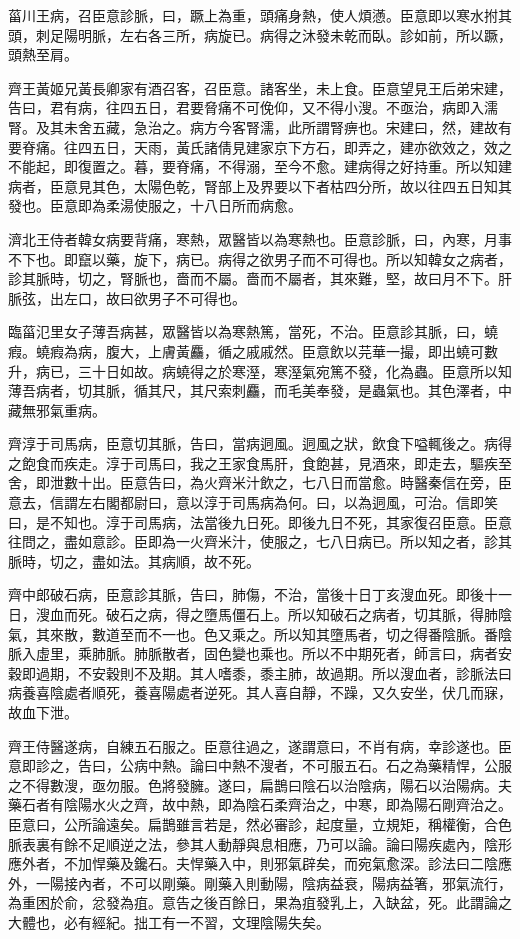 菑川王病，召臣意診脈，曰，蹶上為重，頭痛身熱，使人煩懣。臣意即以寒水拊其頭，刺足陽明脈，左右各三所，病旋已。病得之沐發未乾而臥。診如前，所以蹶，頭熱至肩。

齊王黃姬兄黃長卿家有酒召客，召臣意。諸客坐，未上食。臣意望見王后弟宋建，告曰，君有病，往四五日，君要脅痛不可俛仰，又不得小溲。不亟治，病即入濡腎。及其未舍五藏，急治之。病方今客腎濡，此所謂腎痹也。宋建曰，然，建故有要脊痛。往四五日，天雨，黃氏諸倩見建家京下方石，即弄之，建亦欲效之，效之不能起，即復置之。暮，要脊痛，不得溺，至今不愈。建病得之好持重。所以知建病者，臣意見其色，太陽色乾，腎部上及界要以下者枯四分所，故以往四五日知其發也。臣意即為柔湯使服之，十八日所而病愈。

濟北王侍者韓女病要背痛，寒熱，眾醫皆以為寒熱也。臣意診脈，曰，內寒，月事不下也。即竄以藥，旋下，病已。病得之欲男子而不可得也。所以知韓女之病者，診其脈時，切之，腎脈也，嗇而不屬。嗇而不屬者，其來難，堅，故曰月不下。肝脈弦，出左口，故曰欲男子不可得也。

臨菑氾里女子薄吾病甚，眾醫皆以為寒熱篤，當死，不治。臣意診其脈，曰，蟯瘕。蟯瘕為病，腹大，上膚黃麤，循之戚戚然。臣意飲以芫華一撮，即出蟯可數升，病已，三十日如故。病蟯得之於寒溼，寒溼氣宛篤不發，化為蟲。臣意所以知薄吾病者，切其脈，循其尺，其尺索刺麤，而毛美奉發，是蟲氣也。其色澤者，中藏無邪氣重病。

齊淳于司馬病，臣意切其脈，告曰，當病迵風。迵風之狀，飲食下嗌輒後之。病得之飽食而疾走。淳于司馬曰，我之王家食馬肝，食飽甚，見酒來，即走去，驅疾至舍，即泄數十出。臣意告曰，為火齊米汁飲之，七八日而當愈。時醫秦信在旁，臣意去，信謂左右閣都尉曰，意以淳于司馬病為何。曰，以為迵風，可治。信即笑曰，是不知也。淳于司馬病，法當後九日死。即後九日不死，其家復召臣意。臣意往問之，盡如意診。臣即為一火齊米汁，使服之，七八日病已。所以知之者，診其脈時，切之，盡如法。其病順，故不死。

齊中郎破石病，臣意診其脈，告曰，肺傷，不治，當後十日丁亥溲血死。即後十一日，溲血而死。破石之病，得之墮馬僵石上。所以知破石之病者，切其脈，得肺陰氣，其來散，數道至而不一也。色又乘之。所以知其墮馬者，切之得番陰脈。番陰脈入虛里，乘肺脈。肺脈散者，固色變也乘也。所以不中期死者，師言曰，病者安穀即過期，不安穀則不及期。其人嗜黍，黍主肺，故過期。所以溲血者，診脈法曰病養喜陰處者順死，養喜陽處者逆死。其人喜自靜，不躁，又久安坐，伏几而寐，故血下泄。

齊王侍醫遂病，自練五石服之。臣意往過之，遂謂意曰，不肖有病，幸診遂也。臣意即診之，告曰，公病中熱。論曰中熱不溲者，不可服五石。石之為藥精悍，公服之不得數溲，亟勿服。色將發臃。遂曰，扁鵲曰陰石以治陰病，陽石以治陽病。夫藥石者有陰陽水火之齊，故中熱，即為陰石柔齊治之，中寒，即為陽石剛齊治之。臣意曰，公所論遠矣。扁鵲雖言若是，然必審診，起度量，立規矩，稱權衡，合色脈表裏有餘不足順逆之法，參其人動靜與息相應，乃可以論。論曰陽疾處內，陰形應外者，不加悍藥及鑱石。夫悍藥入中，則邪氣辟矣，而宛氣愈深。診法曰二陰應外，一陽接內者，不可以剛藥。剛藥入則動陽，陰病益衰，陽病益箸，邪氣流行，為重困於俞，忿發為疽。意告之後百餘日，果為疽發乳上，入缺盆，死。此謂論之大體也，必有經紀。拙工有一不習，文理陰陽失矣。

